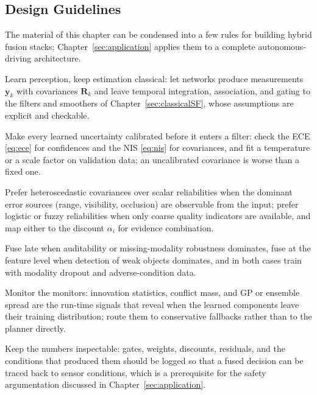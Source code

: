 \subsection{Design Guidelines}
\label{subsec:hybrid-guidelines}
The material of this chapter can be condensed into a few rules for building hybrid fusion stacks; Chapter~\ref{sec:application} applies them to a complete autonomous-driving architecture.
\begin{list4a}
    \item Learn perception, keep estimation classical: let networks produce measurements $\mathbf{y}_k$ with covariances $\mathbf{R}_k$ and leave temporal integration, association, and gating to the filters and smoothers of Chapter~\ref{sec:classicalSF}, whose assumptions are explicit and checkable.
    \item Make every learned uncertainty calibrated before it enters a filter: check the ECE \eqref{eq:ece} for confidences and the NIS \eqref{eq:nis} for covariances, and fit a temperature or a scale factor on validation data; an uncalibrated covariance is worse than a fixed one.
    \item Prefer heteroscedastic covariances over scalar reliabilities when the dominant error sources (range, visibility, occlusion) are observable from the input; prefer logistic or fuzzy reliabilities when only coarse quality indicators are available, and map either to the discount $\alpha_i$ for evidence combination.
    \item Fuse late when auditability or missing-modality robustness dominates, fuse at the feature level when detection of weak objects dominates, and in both cases train with modality dropout and adverse-condition data.
    \item Monitor the monitors: innovation statistics, conflict mass, and GP or ensemble spread are the run-time signals that reveal when the learned components leave their training distribution; route them to conservative fallbacks rather than to the planner directly.
    \item Keep the numbers inspectable: gates, weights, discounts, residuals, and the conditions that produced them should be logged so that a fused decision can be traced back to sensor conditions, which is a prerequisite for the safety argumentation discussed in Chapter~\ref{sec:application}.
\end{list4a}

